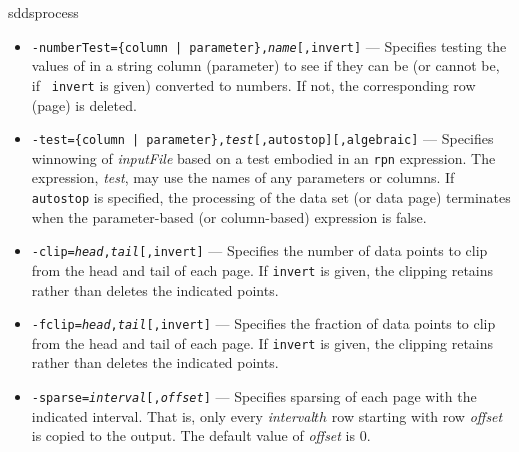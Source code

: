 \begin{sddsprog}{sddsprocess}
\begin{itemize}
\begin{itemize}
If the first character of {\em matchingString} is '@', then the remainder of the string is taken to be the name of a
parameter or column.  In this case, the match is performed to the data in the named entity.  For column-based matching,
this is done row-by-row.  For parameter-based matching, it is done page-by-page.

In addition, if instead of \verb|=| one uses \verb|=+|, then matching is case-insensitive.  The plus sign is intended
to be mnemonic, as the case-insensitive matching results in additional matches.

The use of several match tests and logic is done just as for {\tt -filter}.  For example, to match
all the rows for which the column {\tt Name} starts with 'A' or 'B', one could use
{\tt -match=column,Name=A*,Name=B*,|}.  (This could also be done with {\tt -match=column,Name=[AB]*}.)

\item {\tt -numberTest=\{column | parameter\},{\em name}[,invert]} --- 
Specifies testing the values of in a
string column (parameter) to see if they can be (or cannot be, if {\tt
invert} is given) converted to numbers.  If not, the corresponding row
(page) is deleted.  

\item {\tt -test=\{column | parameter\},{\em test}[,autostop][,algebraic]} --- Specifies
winnowing of {\em inputFile} based on a test embodied in an {\tt rpn} expression.  The expression, {\em test}, may use
the names of any parameters or columns.  If {\tt autostop} is specified, the processing of the data set (or data page)
terminates when the parameter-based (or column-based) expression is false.

        \item {\tt -clip={\em head},{\em tail}[,invert]} --- Specifies the number of data points to clip from the head
and tail of each page.  If {\tt invert} is given, the clipping retains rather than deletes the indicated points.
         \item {\tt -fclip={\em head},{\em tail}[,invert]} --- Specifies the fraction of data points to clip from the head
and tail of each page.  If {\tt invert} is given, the clipping retains rather than deletes the indicated points.
        \item {\tt -sparse={\em interval}[,{\em offset}]} --- Specifies sparsing of each page with the indicated
interval.  That is, only every {\em interval}$ {th}$ row starting with row {\em offset} is copied to the
output.  The default value of {\em offset} is 0.


\end{itemize}
\end{itemize}
\end{sddsprog}
